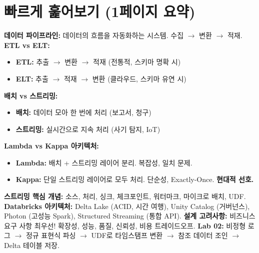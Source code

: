 \documentclass[11pt,a4paper]{article}
\begin{document}
\newpage
\section{빠르게 훑어보기 (1페이지 요약)}

\begin{tcolorbox}[summarybox, title={데이터 파이프라인 핵심 요약}]
\textbf{데이터 파이프라인:} 데이터의 흐름을 자동화하는 시스템. 수집 $\rightarrow$ 변환 $\rightarrow$ 적재.
\textbf{ETL vs ELT:}
\begin{itemize}
    \item \textbf{ETL:} 추출 $\rightarrow$ 변환 $\rightarrow$ 적재 (전통적, 스키마 명확 시)
    \item \textbf{ELT:} 추출 $\rightarrow$ 적재 $\rightarrow$ 변환 (클라우드, 스키마 유연 시)
\end{itemize}
\textbf{배치 vs 스트리밍:}
\begin{itemize}
    \item \textbf{배치:} 데이터 모아 한 번에 처리 (보고서, 청구)
    \item \textbf{스트리밍:} 실시간으로 지속 처리 (사기 탐지, IoT)
\end{itemize}
\textbf{Lambda vs Kappa 아키텍처:}
\begin{itemize}
    \item \textbf{Lambda:} 배치 + 스트리밍 레이어 분리. 복잡성, 일치 문제.
    \item \textbf{Kappa:} 단일 스트리밍 레이어로 모두 처리. 단순성, Exactly-Once. \textbf{현대적 선호.}
\end{itemize}
\textbf{스트리밍 핵심 개념:} 소스, 처리, 싱크, 체크포인트, 워터마크, 마이크로 배치, UDF.
\textbf{Databricks 아키텍처:} Delta Lake (ACID, 시간 여행), Unity Catalog (거버넌스), Photon (고성능 Spark), Structured Streaming (통합 API).
\textbf{설계 고려사항:} 비즈니스 요구 사항 최우선! 확장성, 성능, 품질, 신뢰성, 비용 트레이드오프.
\textbf{Lab 02:} 비정형 로그 $\rightarrow$ 정규 표현식 파싱 $\rightarrow$ UDF로 타임스탬프 변환 $\rightarrow$ 참조 데이터 조인 $\rightarrow$ Delta 테이블 저장.
\end{tcolorbox}
\end{document}
